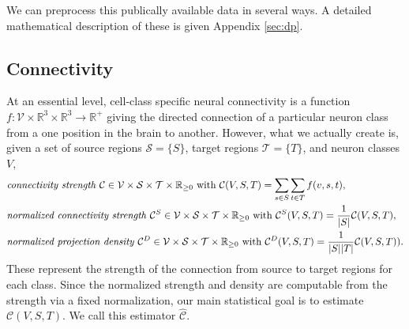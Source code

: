 We can preprocess this publically available data in several ways.
A detailed mathematical description of these is given Appendix \ref{sec:dp}.

\newpage

\subsection{Connectivity}

At an essential level, cell-class specific neural connectivity is a function $f:  \mathcal V \times \mathbb R^3 \times \mathbb R^3 \to \mathbb R^+$ giving the directed connection of a particular neuron class from a one position in the brain to another.
However, what we actually create is, given a set of source regions $\mathcal S = \{ S\} $, target regions $\mathcal T = \{ T \}$, and neuron classes $V$, 
\begin{align*}
&\text{\textit {connectivity strength} } \mathcal C \in \mathcal V \times \mathcal S \times \mathcal T \times \mathbb R_{\geq 0}  \text{ with } \mathcal C(V,S,T) = \sum_{s \in S} \sum_{t \in  T} f(v,s,t), \\
&\text{\textit {normalized connectivity strength} } \mathcal C^S \in \mathcal V \times \mathcal S \times \mathcal T \times \mathbb R_{\geq 0}  \text{ with } \mathcal C^S(V,S,T) = \frac{1}{|S|} \mathcal C(V,S,T), \\
&\text{\textit {normalized projection density} } \mathcal C^D \in \mathcal V \times \mathcal S \times \mathcal T \times \mathbb R_{\geq 0} \text{ with } \mathcal C^D(V,S,T) = \frac{1}{| S | | T|}\mathcal C(V,S,T)).
\end{align*}
These represent the strength of the connection from source to target regions for each class.
Since the normalized strength and density are computable from the strength via a fixed normalization, our main statistical goal is to estimate $\mathcal C (V,S,T)$. %
We call this estimator $\widehat { \mathcal C } $.

